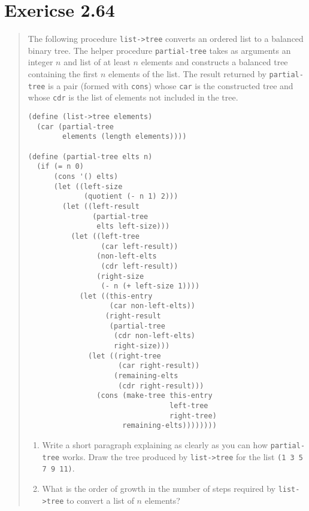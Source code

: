 \documentclass{article}
\begin{document}
\section{Exericse 2.64}
\begin{quote}
    The following procedure \texttt{list->tree} converts an ordered list to a
    balanced binary tree. The helper procedure \texttt{partial-tree} takes as
    arguments an integer $n$ and list of at least $n$ elements and constructs a
    balanced tree containing the first $n$ elements of the list. The result
    returned by \texttt{partial-tree} is a pair (formed with \texttt{cons})
    whose \texttt{car} is the constructed tree and whose \texttt{cdr} is the
    list of elements not included in the tree.

    \begin{lstlisting}
(define (list->tree elements)
  (car (partial-tree
        elements (length elements))))

(define (partial-tree elts n)
  (if (= n 0)
      (cons '() elts)
      (let ((left-size
             (quotient (- n 1) 2)))
        (let ((left-result
               (partial-tree
                elts left-size)))
          (let ((left-tree
                 (car left-result))
                (non-left-elts
                 (cdr left-result))
                (right-size
                 (- n (+ left-size 1))))
            (let ((this-entry
                   (car non-left-elts))
                  (right-result
                   (partial-tree
                    (cdr non-left-elts)
                    right-size)))
              (let ((right-tree
                     (car right-result))
                    (remaining-elts
                     (cdr right-result)))
                (cons (make-tree this-entry
                                 left-tree
                                 right-tree)
                      remaining-elts))))))))
    \end{lstlisting}

    \begin{enumerate}
        \item Write a short paragraph explaining as clearly as you can how
            \texttt{partial-tree} works. Draw the tree produced by
            \texttt{list->tree} for the list \texttt{(1 3 5 7 9 11)}.
        \item What is the order of growth in the number of steps required by
            \texttt{list->tree} to convert a list of $n$ elements?
    \end{enumerate}
\end{quote}
\end{document}
